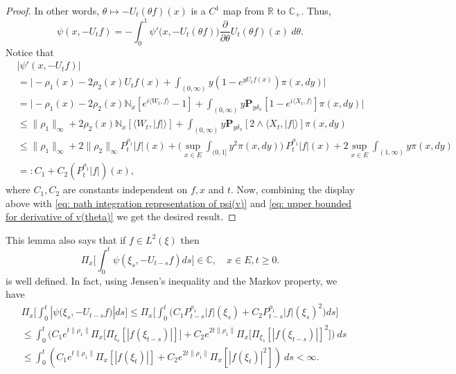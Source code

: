 \documentclass[12pt,a4paper]{amsart}
\theoremstyle{plain}
\theoremstyle{definition}
\numberwithin{equation}{section}
\begin{document}
\begin{proof}
  In other words, $\theta \mapsto -U_t(\theta f)(x)$ is a $C^1$ map from $\mathbb R$ to $\mathbb C_+$.
  Thus,
  \begin{equation}
    \label{eq: path integration representation of psi(v)}
    \psi(x,-U_tf)
    = -\int_0^1 \psi'\big(x,-U_t(\theta f)\big) \frac{\partial}{\partial \theta} U_t(\theta f)(x)~d\theta.
  \end{equation}
  Notice that
  \begin{align}
    & |\psi'(x, -U_tf)| \\
    & = \Big| -\rho_1(x)- 2\rho_2(x) U_tf(x)+ \int_{(0,\infty)} y (1- e^{y U_tf(x)} ) \pi(x,dy)\Big| \\
    & = \Big| - \rho_1(x)- 2\rho_2(x)\mathbb N_x[e^{i \langle W_t, f\rangle} - 1]  + \int_{(0,\infty)} y \mathbf P_{y \delta_x}[1-e^{i \langle X_t, f\rangle}] \pi(x,dy) \Big| \\ 
    & \leq \|\rho_1\|_\infty + 2\rho_2(x)\mathbb N_x[\langle W_t, |f|\rangle]+ \int_{(0,\infty)} y\mathbf P_{y\delta_x}[2\wedge \langle X_t, |f|\rangle] \pi(x,dy) \\ 
    & \leq \|\rho_1\|_\infty + 2\|\rho_2\|_\infty P^{\rho_1}_t |f|(x) + \Big(\sup_{x\in E}\int_{(0,1]}y^2 \pi(x,dy)\Big)~P^{\rho_1}_t |f|(x) + 2\sup_{x\in E}\int_{(1,\infty)} y \pi(x,dy) \\ 
    & =: C_1 + C_2(P^{\rho_1}_t |f|)(x), \label{eq: upper bound of psi'(v)}
  \end{align}
  where $C_1, C_2$ are constants independent on $f,x$ and $t$.
  Now, combining the display above with \eqref{eq: path integration representation of psi(v)} and \eqref{eq: upper bounded for derivative of v(theta)}
  we get the desired result.
\end{proof}
This lemma also says that if $f\in L^2(\xi)$ then
\[
  \Pi_x\Big[\int_0^t \psi(\xi_s,- U_{t-s}f)ds\Big]
  \in \mathbb C,
  \quad x\in E, t\geq 0.
\]
is well defined.
In fact, using Jensen's inequality and the Markov property, we have
\begin{align}
  \label{eq: domination of psi(v)}
  & \Pi_x\Big[\int_0^t |\psi \big(\xi_s,-U_{t-s}f\big)|ds\Big]
  \leq \Pi_x\Big[\int_0^t \big(C_1 P_{t-s}^{\rho_1}|f|(\xi_s)+C_2 P_{t-s}^{\rho_1}|f|(\xi_s)^2\big)ds\Big] \\ 
  & \leq \int_0^t \big(C_1 e^{t\|\rho_1\|}\Pi_x \big[ \Pi_{\xi_s}[|f(\xi_{t-s})|] \big]+C_2 e^{2t\|\rho_1\|}\Pi_x \big[ \Pi_{\xi_s}[|f (\xi_{t-s})|]^2 \big]\big)~ds \\ 
  & \leq \int_0^t (C_1 e^{t\|\rho_1\|}\Pi_x [ |f(\xi_{t})|]+C_2e^{2t\|\rho_1\|}\Pi_x [ |f (\xi_{t})|^2 ])~ds < \infty.
\end{align}
\end{document}

